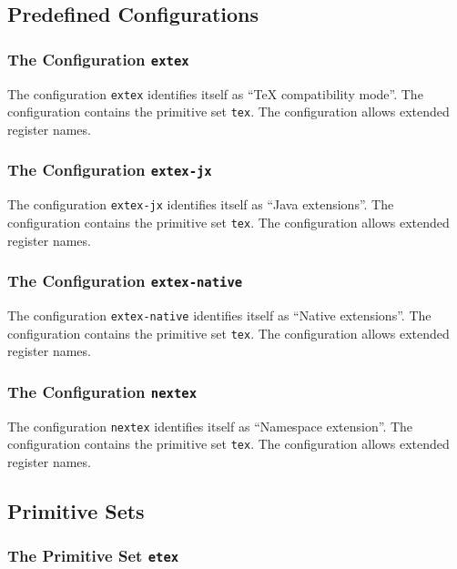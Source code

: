 
\subsection{Predefined Configurations}

\subsubsection{The Configuration \texttt{extex}}

The configuration \texttt{extex} identifies itself as
``TeX compatibility mode''.
The configuration contains the primitive set \texttt{tex}.
The configuration allows extended register names.

\subsubsection{The Configuration \texttt{extex-jx}}

The configuration \texttt{extex-jx} identifies itself as
``Java extensions''.
The configuration contains the primitive set \texttt{tex}.
The configuration allows extended register names.

\subsubsection{The Configuration \texttt{extex-native}}

The configuration \texttt{extex-native} identifies itself as
``Native extensions''.
The configuration contains the primitive set \texttt{tex}.
The configuration allows extended register names.

\subsubsection{The Configuration \texttt{nextex}}

The configuration \texttt{nextex} identifies itself as
``Namespace extension''.
The configuration contains the primitive set \texttt{tex}.
The configuration allows extended register names.

\subsection{Primitive Sets}
\subsubsection{The Primitive Set \texttt{etex}}

